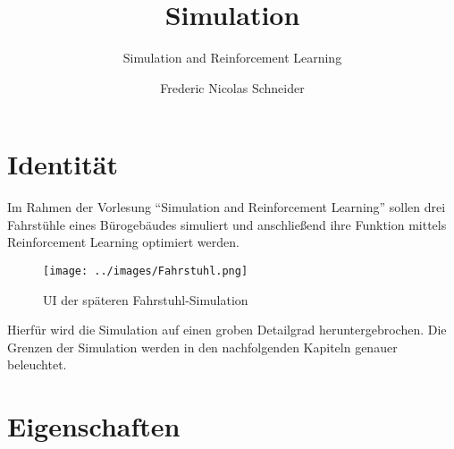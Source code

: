 \documentclass[envcountsame, envcountchap, deutsch]{i-studis}
\begin{document}
\title{Simulation}
\subtitle{Simulation and Reinforcement Learning}

\author{Frederic Nicolas Schneider}


\address{Trier}


\mytitlepage

\frontmatter
\tableofcontents										%


\mainmatter
\newpage

\hypertarget{identituxe4t}{%
\chapter{Identität}\label{identituxe4t}}

Im Rahmen der Vorlesung ``Simulation and Reinforcement Learning'' sollen
drei Fahrstühle eines Bürogebäudes simuliert und anschließend ihre
Funktion mittels Reinforcement Learning optimiert werden.

\begin{figure}
\centering
\texttt{[image: ../images/Fahrstuhl.png]}
\caption{UI der späteren Fahrstuhl-Simulation}
\end{figure}

Hierfür wird die Simulation auf einen groben Detailgrad
heruntergebrochen. Die Grenzen der Simulation werden in den
nachfolgenden Kapiteln genauer beleuchtet.

\hypertarget{eigenschaften}{%
\chapter{Eigenschaften}\label{eigenschaften}}
\end{document}
